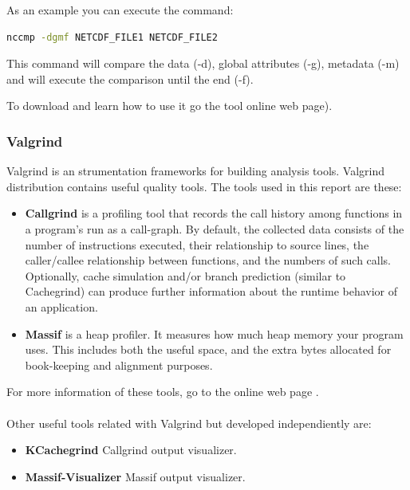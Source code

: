 As an example you can execute the command:
\begin{lstlisting}[language=bash]
nccmp -dgmf NETCDF_FILE1 NETCDF_FILE2
\end{lstlisting}
This command will compare the data (-d), global attributes (-g), metadata (-m) and will execute the comparison until the end (-f).

To download and learn how to use it go the tool online web page\cite{nccmp}).

\subsubsection{Valgrind}\label{subsubsec:tools_valgrind}

Valgrind is an strumentation frameworks for building analysis tools. Valgrind distribution contains useful quality tools. The tools used in this report are these:
\begin{itemize}
\item{{\bf Callgrind}\cite{val_callgrind}} is a profiling tool that records the call history among functions in a program's run as a call-graph. By default, the collected data consists of the number of instructions executed, their relationship to source lines, the caller/callee relationship between functions, and the numbers of such calls. Optionally, cache simulation and/or branch prediction (similar to Cachegrind) can produce further information about the runtime behavior of an application.
\item{{\bf Massif}\cite{val_massif}} is a heap profiler. It measures how much heap memory your program uses. This includes both the useful space, and the extra bytes allocated for book-keeping and alignment purposes.
\end{itemize}

For more information of these tools, go to the online web page \cite{valgrind}.
\\\\
Other useful tools related with Valgrind but developed independiently are:
\begin{itemize}
\item{{\bf KCachegrind}\cite{kcachegrind}} Callgrind output visualizer.
\item{{\bf Massif-Visualizer}\cite{massif-visualizer}} Massif output visualizer.
\end{itemize}
